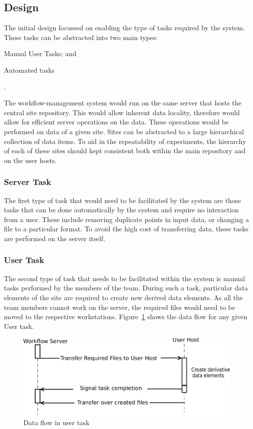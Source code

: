 \subsection{Design}
The initial design focussed on enabling the type of tasks required by the system.
These tasks can be abstracted into two main types: \begin{inparaenum}[(i)] \item
Manual User Tasks; and \item Automated tasks\end{inparaenum}.


The workflow-management system would  run on the same server that hosts the central
site repository. This would allow inherent data locality, therefore would allow for
efficient server operations on the data. These operations would be performed on data
of a given site. Sites can be abstracted to a large hierarchical collection of data
items. To aid in the repeatability of experiments, the hierarchy of each of these
sites should kept consistent both within the main repository and on the user hosts.

\subsubsection*{Server Task}
The first type of task that would need to be facilitated by the system are those
tasks that can be done automatically by the system and require no interaction
from a user. These include removing duplicate points in input data, or changing
a file to a particular format. To avoid the high cost of transferring data, these
tasks are performed on the server itself.

\subsubsection*{User Task}
The second type of task that needs to be facilitated within the system is manual
tasks performed by the members of the team. During such a task, particular data
elements of the site are required to create new derived data elements. As all the
team members cannot work on the server, the required files would need to be moved
to the respective workstations. Figure~\ref{data_flow} shows the data flow for any given
User task.
\begin{figure}[!h]
    \begin{center}
        \includegraphics[scale=0.5]{figures/data_flow.pdf}
    \end{center}
    \caption{Data flow in user task}
    \label{data_flow}
\end{figure}

